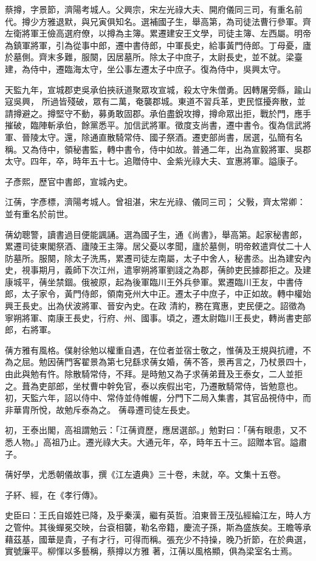 \begin{pinyinscope}
 蔡撙，字景節，濟陽考城人。父興宗，宋左光祿大夫、開府儀同三司，有重名前代。撙少方雅退默，與兄寅俱知名。選補國子生，舉高第，為司徒法曹行參軍。齊左衛將軍王儉高選府僚，以撙為主簿。累遷建安王文學，司徒主簿、左西屬。明帝為鎮軍將軍，引為從事中郎，遷中書侍郎，中軍長史，給事黃門侍郎。丁母憂，廬於墓側。齊末多難，服闋，因居墓所。除太子中庶子，太尉長史，並不就。梁臺建，為侍中，遷臨海太守，坐公事左遷太子中庶子。復為侍中，吳興太守。



 天監九年，宣城郡吏吳承伯挾祅道聚眾攻宣城，殺太守朱僧勇。因轉屠旁縣，踰山寇吳興，
 所過皆殘破，眾有二萬，奄襲郡城。東道不習兵革，吏民恇擾奔散，並請撙避之。撙堅守不動，募勇敢固郡。承伯盡銳攻撙，撙命眾出拒，戰於門，應手摧破，臨陣斬承伯，餘黨悉平。加信武將軍。徵度支尚書，遷中書令。復為信武將軍、晉陵太守。還，除通直散騎常侍、國子祭酒。遷吏部尚書，居選，弘簡有名稱。又為侍中，領秘書監，轉中書令，侍中如故。普通二年，出為宣毅將軍、吳郡太守。四年，卒，時年五十七。追贈侍中、金紫光祿大夫、宣惠將軍。謚康子。



 子彥熙，歷官中書郎，宣城內史。



 江蒨，字彥標，濟陽考城人。曾祖湛，宋左光祿、儀同三司；
 父斅，齊太常卿：並有重名於前世。



 蒨幼聰警，讀書過目便能諷誦。選為國子生，通《尚書》，舉高第。起家秘書郎，累遷司徒東閣祭酒、廬陵王主簿。居父憂以孝聞，廬於墓側，明帝敕遣齊仗二十人防墓所。服闋，除太子洗馬，累遷司徒左南屬，太子中舍人，秘書丞。出為建安內史，視事期月，義師下次江州，遣寧朔將軍劉諓之為郡，蒨帥吏民據郡拒之。及建康城平，蒨坐禁錮。俄被原，起為後軍臨川王外兵參軍。累遷臨川王友，中書侍郎，太子家令，黃門侍郎，領南兗州大中正。遷太子中庶子，中正如故。轉中權始興王長史。出為伏波將軍、晉安內史。在政
 清約，務在寬惠，吏民便之。詔徵為寧朔將軍、南康王長史，行府、州、國事。頃之，遷太尉臨川王長史，轉尚書吏部郎，右將軍。



 蒨方雅有風格。僕射徐勉以權重自遇，在位者並宿士敬之，惟蒨及王規與抗禮，不為之屈。勉因蒨門客翟景為第七兒繇求蒨女婚，蒨不答，景再言之，乃杖景四十，由此與勉有忤。除散騎常侍，不拜。是時勉又為子求蒨弟葺及王泰女，二人並拒之。葺為吏部郎，坐杖曹中幹免官，泰以疾假出宅，乃遷散騎常侍，皆勉意也。初，天監六年，詔以侍中、常侍並侍帷幄，分門下二局入集書，其官品視侍中，而非華胄所悅，故勉斥泰為之。
 蒨尋遷司徒左長史。



 初，王泰出閣，高祖謂勉云：「江蒨資歷，應居選部。」勉對曰：「蒨有眼患，又不悉人物。」高祖乃止。遷光祿大夫。大通元年，卒，時年五十三。詔贈本官。謚肅子。



 蒨好學，尤悉朝儀故事，撰《江左遺典》三十卷，未就，卒。文集十五卷。



 子紑、經，在《孝行傳》。



 史臣曰：王氏自姬姓已降，及乎秦漢，繼有英哲。洎東晉王茂弘經綸江左，時人方之管仲。其後蟬冕交映，台袞相襲，勒名帝籍，慶流子孫，斯為盛族矣。王瞻等承藉茲基，國華是貴，子有才行，可得而稱。張充少不持操，晚乃折節，在於典選，實號廉平。柳惲以多藝稱，蔡撙以方雅
 著，江蒨以風格顯，俱為梁室名士焉。



\end{pinyinscope}